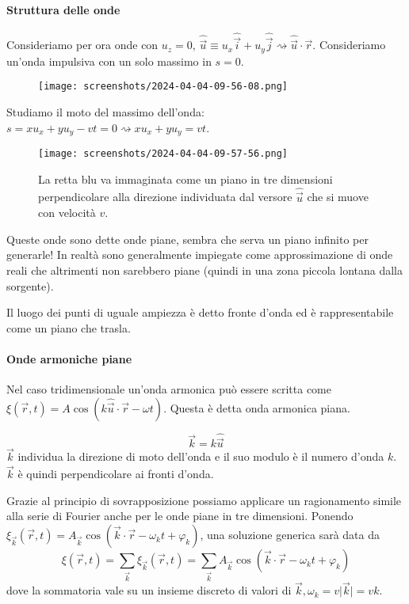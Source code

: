 \paragraph{Struttura delle onde}
Consideriamo per ora onde con \(u_z = 0\), \(\hat{\vec{u}} \equiv u_x \hat{\vec{i}} + u_y \hat{\vec{j}} \rightsquigarrow \hat{\vec{u}} \cdot \vec{r}\). Consideriamo un'onda impulsiva con un solo massimo in \(s=0\).
\begin{figure}[H]
	\centering
	\texttt{[image: screenshots/2024-04-04-09-56-08.png]}
\end{figure}
Studiamo il moto del massimo dell'onda: \(s=xu_x + yu_y - vt = 0 \rightsquigarrow xu_x + yu_y = vt\).
\begin{figure}[H]
	\centering
	\texttt{[image: screenshots/2024-04-04-09-57-56.png]}
	\caption{La retta blu va immaginata come un piano in tre dimensioni perpendicolare alla direzione individuata dal versore \(\hat{\vec{u}} \) che si muove con velocità \(v\).}
\end{figure}
Queste onde sono dette onde piane, sembra che serva un piano infinito per generarle! In realtà sono generalmente impiegate come approssimazione di onde reali che altrimenti non sarebbero piane (quindi in una zona piccola lontana dalla sorgente).
\begin{definition}
	Il luogo dei punti di uguale ampiezza è detto fronte d'onda ed è rappresentabile come un piano che trasla.
\end{definition}

\paragraph{Onde armoniche piane}
Nel caso tridimensionale un'onda armonica può essere scritta come \(\xi (\vec{r},t ) = A \cos (k \hat{\vec{u}} \cdot \vec{r} - \omega t)\). Questa è detta onda armonica piana.
\begin{definition}
	\[
		\vec{k} = k \hat{\vec{u}} 
	\]
	\(\vec{k}\) individua la direzione di moto dell'onda e il suo modulo è il numero d'onda \(k\). \(\vec{k}\) è quindi perpendicolare ai fronti d'onda.
\end{definition}
Grazie al principio di sovrapposizione possiamo applicare un ragionamento simile alla serie di Fourier anche per le onde piane in tre dimensioni. Ponendo \(\xi _{\vec{k}}(\vec{r}, t) = A_{\vec{k}}\cos (\vec{k}\cdot \vec{r} - \omega _k t + \varphi _k )\), una soluzione generica sarà data da
\[
	\xi (\vec{r}, t)= \sum_{\vec{k}}\xi _{\vec{k}}(\vec{r},t) = \sum_{\vec{k}}A_{\vec{k}} \cos (\vec{k}\cdot \vec{r} - \omega _k t + \varphi _k )  
\]
dove la sommatoria vale su un insieme discreto di valori di \(\vec{k}, \omega _k = v \vert \vec{k} \vert = vk\).